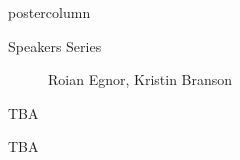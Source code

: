 \documentclass{beamer}
\begin{document}
\begin{frame}
\begin{columns}
\begin{column}{.33\textwidth}
\begin{beamercolorbox}[center,wd=\textwidth]{postercolumn}
\begin{minipage}[T]{.95\textwidth}
{\begin{myblock}{Speakers Series}
\begin{addmargin}[1em]{1em}
\begin{figure}
                    \caption{Roian Egnor, Kristin Branson}
                    \label{fig:workspace}
                    \vspace{1.3cm}
                \end{figure}
            \end{addmargin}
            \vspace{1cm}
          \end{myblock}\vspace{1.25cm}
			\begin{myblock}{TBA}
                \begin{addmargin}[1em]{1em}
                \end{addmargin}
            \end{myblock}\vspace{1.25cm}

			\begin{myblock}{TBA}
                \begin{addmargin}[1em]{1em}
                \end{addmargin}
			\end{myblock}
		}\end{minipage}\end{beamercolorbox}
	\end{column}
\end{columns}
\end{frame}
\end{document}
